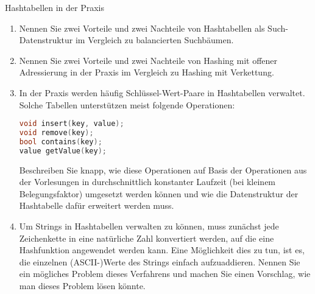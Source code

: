 \documentclass[11pt,a4paper]{article}
\begin{document}
\begin{aufgabe}{3}{Hashtabellen in der Praxis}
    \begin{enumerate}
        \item Nennen Sie zwei Vorteile und zwei Nachteile von Hashtabellen als Such-Datenstruktur im Vergleich zu balancierten Suchbäumen.
        \item Nennen Sie zwei Vorteile und zwei Nachteile von Hashing mit offener Adressierung in der Praxis im Vergleich zu Hashing mit Verkettung.
        \item \hard In der Praxis werden häufig Schlüssel-Wert-Paare in Hashtabellen verwaltet.
        Solche Tabellen unterstützen meist folgende Operationen:
        \begin{lstlisting}[language=c++]
void insert(key, value);
void remove(key);
bool contains(key);
value getValue(key);
        \end{lstlisting}
        Beschreiben Sie knapp, wie diese Operationen auf Basis der Operationen aus der Vorlesungen in durchschnittlich konstanter Laufzeit (bei kleinem Belegungsfaktor) umgesetzt werden können und wie die Datenstruktur der Hashtabelle dafür erweitert werden muss.
        \item \hard Um Strings in Hashtabellen verwalten zu können, muss zunächst jede Zeichenkette in eine natürliche Zahl konvertiert werden, auf die eine Hashfunktion angewendet werden kann.
        Eine Möglichkeit dies zu tun, ist es, die einzelnen (ASCII-)Werte des Strings einfach aufzuaddieren.
        Nennen Sie ein mögliches Problem dieses Verfahrens und machen Sie einen Vorschlag, wie man dieses Problem lösen könnte.
    \end{enumerate}
\end{aufgabe}
\end{document}
